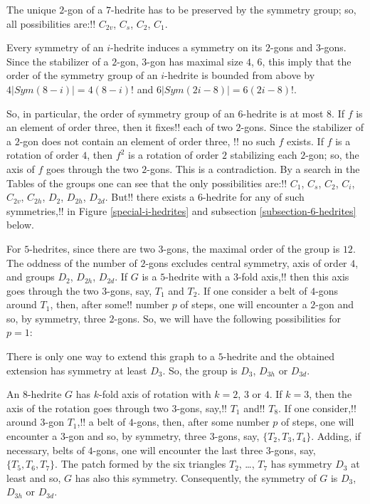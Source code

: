 \documentclass[12pt]{article}
\begin{document}
The unique $2$-gon of a $7$-hedrite has to be preserved by the symmetry
group; so, all possibilities are:!! $C_{2v}$, $C_s$, $C_2$, $C_1$.

Every symmetry of an $i$-hedrite induces a symmetry on its $2$-gons and $3$-gons. Since the stabilizer of a $2$-gon, $3$-gon has maximal size $4$, $6$, this imply that the order of the symmetry group of an $i$-hedrite is bounded from above by $4|Sym(8-i)|=4(8-i)!$ and $6|Sym(2i-8)|=6(2i-8)!$.

So, in particular, the order of symmetry group of an $6$-hedrite is at
most $8$. If $f$ is an element of order three, then it fixes!! each of two
$2$-gons. Since the stabilizer of a $2$-gon does not contain an element
of order three, !! no such $f$ exists. If $f$ is a rotation of
order $4$, then $f^2$ is a rotation of order $2$ stabilizing each $2$-gon;
so, the axis of $f$ goes through the two $2$-gons. This is a contradiction.
By a search in the Tables of the groups one can see that the only possibilities are:!! $C_1$, $C_s$, $C_2$, $C_i$, $C_{2v}$, $C_{2h}$, $D_2$, $D_{2h}$, $D_{2d}$. But!! there exists a $6$-hedrite for any of such symmetries,!! in Figure \ref{special-i-hedrites} and subsection \ref{subsection-6-hedrites} below.

For $5$-hedrites, since there are two $3$-gons, the maximal order of the group is $12$. The oddness of the number of $2$-gons excludes central symmetry, axis of order $4$, and groups $D_2$, $D_{2h}$, $D_{2d}$.
If $G$ is a $5$-hedrite with a $3$-fold axis,!! then this axis goes through
the two $3$-gons, say, $T_1$ and $T_2$. If one consider a belt of $4$-gons
around $T_1$, then, after some!! number $p$ of steps, one will encounter a
$2$-gon and so, by symmetry, three $2$-gons. So, we will have the 
following possibilities for $p=1$:

\begin{center}
\epsfxsize=90mm
\end{center}

There is only one way to extend this graph to a $5$-hedrite and the obtained extension has symmetry at least $D_3$. So, the group is $D_{3}$, $D_{3h}$ or $D_{3d}$.

An $8$-hedrite $G$ has $k$-fold axis of rotation with $k=2$, $3$ or $4$. 
If $k=3$, then the axis of the rotation goes through two $3$-gons,
say,!! $T_1$ and!! $T_8$. If one consider,!! around $3$-gon $T_1$,!! a belt of 
$4$-gons, then, after some number $p$ of steps, one will encounter a 
$3$-gon and so, by symmetry, three $3$-gons, say, $\{T_2,T_3,T_4\}$. 
Adding, if necessary, belts of $4$-gons, one will encounter the last 
three $3$-gons, say, $\{T_5,T_6,T_7\}$. The patch formed by the six
triangles $T_2$, \dots, $T_7$ has symmetry $D_3$ at least and so, 
$G$ has also this symmetry. Consequently, the symmetry of $G$ is $D_3$,
$D_{3h}$ or $D_{3d}$.
\end{document}
